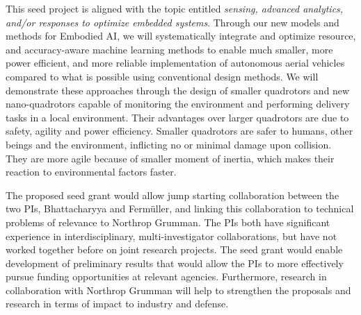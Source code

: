 
This seed project is aligned with the topic entitled {\em sensing, advanced
analytics, and/or responses to optimize embedded systems}.  Through our new
models and methods for Embodied AI, we will systematically integrate and
optimize resource, and accuracy-aware machine learning methods to enable much
smaller, more power efficient, and more reliable implementation of autonomous
aerial vehicles compared to what is possible using conventional design methods.
We will demonstrate these approaches through the design of smaller quadrotors
and new nano-quadrotors capable of monitoring the environment and performing
delivery tasks in a local environment. Their advantages over larger quadrotors
are due to safety, agility and power efficiency. Smaller quadrotors are safer
to humans, other beings and the environment, inflicting no or minimal damage
upon collision. They are more agile because  of smaller moment
of inertia, which makes their reaction to environmental factors faster.

The proposed seed grant would allow  jump
starting collaboration between the two PIs, Bhattacharyya and Ferm\"{u}ller,
and linking this collaboration to technical problems  of relevance to
Northrop Grumman.  The PIs both have significant experience in
interdisciplinary, multi-investigator collaborations, but have not worked together
before on joint research projects. The seed grant would enable development of
preliminary results that would allow the PIs to more effectively 
pursue funding opportunities at relevant agencies. Furthermore, research in collaboration with Northrop Grumman will help to strengthen the
proposals and research in terms of impact to industry and defense.




